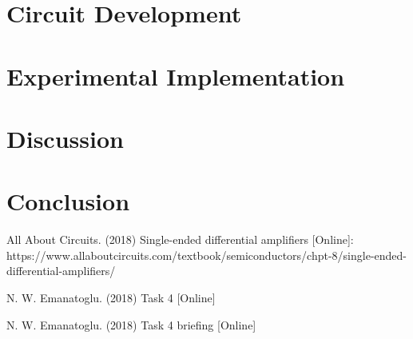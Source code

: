 \documentclass{article}
\begin{document}
  \section{Circuit Development}
    
    

     
 
    
  \section{Experimental Implementation}
    
    
  \section{Discussion}
     
    
    
    \section{Conclusion}
        

    



\clearpage

\appendix

\begin{thebibliography}{00}

 All About Circuits. (2018) Single-ended differential amplifiers [Online]: https://www.allaboutcircuits.com/textbook/semiconductors/chpt-8/single-ended-differential-amplifiers/

 N. W. Emanatoglu. (2018) Task 4 [Online]

 N. W. Emanatoglu. (2018) Task 4 briefing [Online]
 

\end{thebibliography}
\end{document}
